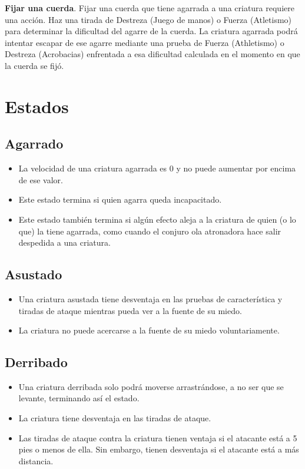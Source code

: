 \documentclass[10pt,twoside,twocolumn,openany]{dndbook}
\begin{document}
\textbf{Fijar una cuerda}. Fijar una cuerda que tiene agarrada a una criatura requiere una 
acción. Haz una tirada de Destreza (Juego de manos) o Fuerza (Atletismo) para determinar 
la dificultad del agarre de la cuerda. La criatura agarrada podrá intentar escapar de ese 
agarre mediante una prueba de Fuerza (Athletismo) o Destreza (Acrobacias) enfrentada a esa 
dificultad calculada en el momento en que la cuerda se fijó.

\section*{Estados}

\subsection*{Agarrado}
\begin{itemize}
  \item La velocidad de una criatura agarrada es 0 y no puede aumentar por encima de ese valor.
  \item Este estado termina si quien agarra queda incapacitado.
  \item Este estado también termina si algún efecto aleja a la criatura de quien (o lo que) la 
  tiene agarrada, como cuando el conjuro ola atronadora hace salir despedida a una criatura.
\end{itemize}

\subsection*{Asustado}
\begin{itemize}
  \item Una criatura asustada tiene desventaja en las pruebas de característica y tiradas de 
  ataque mientras pueda ver a la fuente de su miedo.
  \item La criatura no puede acercarse a la fuente de su miedo voluntariamente.
\end{itemize}

\subsection*{Derribado}
\begin{itemize}
  \item Una criatura derribada solo podrá moverse arrastrándose, a no ser que se levante, 
  terminando así el estado.
  \item La criatura tiene desventaja en las tiradas de ataque.
  \item Las tiradas de ataque contra la criatura tienen ventaja si el atacante está a 5 pies o 
  menos de ella. Sin embargo, tienen desventaja si el atacante está a más distancia.
\end{itemize}
\end{document}
